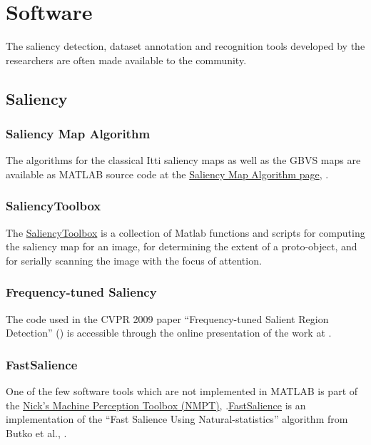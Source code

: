 \section{Software}
\label{sec:soft}

The saliency detection, dataset annotation and recognition tools developed by the researchers are often made available to the community.

\subsection{Saliency}

\subsubsection{Saliency Map Algorithm} \label{subsec:salmap}
The algorithms for the classical Itti  \cite{Itti_Koch01nrn} saliency maps as well as the GBVS maps \cite{Harel07graph-basedvisual} are available as MATLAB source code at the \href{subsec:salmap}{Saliency Map Algorithm page}, \cite{salmap_soft}.

\subsubsection{SaliencyToolbox}\label{subsec:saltool}
The \href{http://saliencytoolbox.net/index.html}{SaliencyToolbox} \cite{saltool_soft} is a collection of Matlab functions and scripts for computing the saliency map for an image, for determining the extent of a proto-object, and for serially scanning the image with the focus of attention. 

\subsubsection{Frequency-tuned Saliency}
The code used in the CVPR 2009 paper ``Frequency-tuned Salient Region Detection'' (\cite{LCAV-CONF-2009-012}) is accessible through the online presentation of the work at \cite{achantaCVPR09}.

\subsubsection{FastSalience}\label{soft:fastsal:subsec}
One of the few software tools which are not implemented in MATLAB is part of the \href{http://mplab.ucsd.edu/~nick/NMPT/main.html}{Nick's Machine Perception Toolbox (NMPT)}, \cite{nmpt_soft}.\href{http://mplab.ucsd.edu/~nick/NMPT/class_fast_salience.html}{FastSalience} is an implementation of the ``Fast Salience Using Natural-statistics'' algorithm from Butko et al., \cite{ButkoZCM08}.

